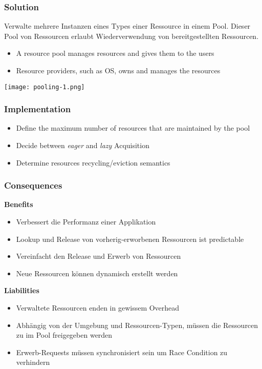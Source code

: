 \subsubsection{Solution}
Verwalte mehrere Instanzen eines Types einer Ressource in einem Pool. Dieser Pool von Ressourcen erlaubt Wiederverwendung von bereitgestellten Ressourcen.

\begin{itemize}
    \item A resource pool manages resources and gives them to the users
    \item Resource providers, such as OS, owns and manages the resources
\end{itemize}
\texttt{[image: pooling-1.png]}
\subsubsection{Implementation}
\begin{itemize}
    \item Define the maximum number of resources that are maintained by the pool
    \item Decide between \textit{eager} and \textit{lazy} Acquisition
    \item Determine resources recycling/eviction semantics
\end{itemize}

\subsubsection{Consequences}
\textbf{Benefits}
\begin{itemize}
    \item Verbessert die Performanz einer Applikation
    \item Lookup und Release von vorherig-erworbenen Ressourcen ist predictable
    \item Vereinfacht den Release und Erwerb von Ressourcen
    \item Neue Ressourcen können dynamisch erstellt werden
\end{itemize}
\vspace{10pt}
\textbf{Liabilities}
\begin{itemize}
    \item Verwaltete Ressourcen enden in gewissem Overhead
    \item Abhängig von der Umgebung und Ressourcen-Typen, müssen die Ressourcen zu im Pool freigegeben werden
    \item Erwerb-Requests müssen synchronisiert sein um Race Condition zu verhindern
\end{itemize}

